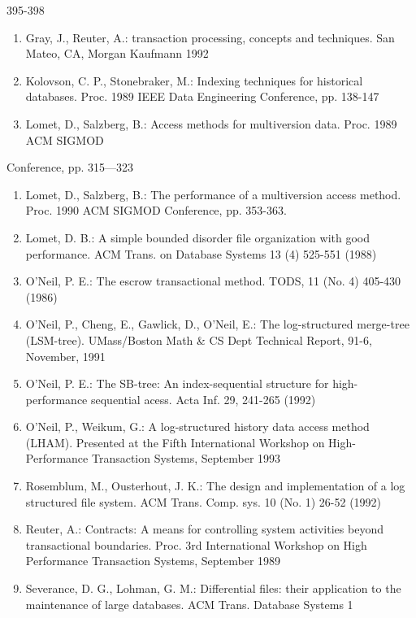 \documentclass[a4paper,12pt,notitlepage,twoside,openright]{article}
\begin{document}
395-398


\begin{enumerate}
\def\labelenumi{\arabic{enumi}.}
\setcounter{enumi}{13}
\item
  Gray, J., Reuter, A.: transaction processing, concepts and techniques.
  San Mateo, CA, Morgan Kaufmann 1992
\item
  Kolovson, C. P., Stonebraker, M.: Indexing techniques for historical
  databases. Proc. 1989 IEEE Data Engineering Conference, pp. 138-147
\item
  Lomet, D., Salzberg, B.: Access methods for multiversion data. Proc.
  1989 ACM SIGMOD
\end{enumerate}


Conference, pp. 315---323


\begin{enumerate}
\def\labelenumi{\arabic{enumi}.}
\setcounter{enumi}{16}
\item
  Lomet, D., Salzberg, B.: The performance of a multiversion access
  method. Proc. 1990 ACM SIGMOD Conference, pp. 353-363.
\item
  Lomet, D. B.: A simple bounded disorder file organization with good
  performance. ACM Trans. on Database Systems 13 (4) 525-551 (1988)
\item
  O'Neil, P. E.: The escrow transactional method. TODS, 11 (No. 4)
  405-430 (1986)
\item
  O'Neil, P., Cheng, E., Gawlick, D., O'Neil, E.: The log-structured
  merge-tree (LSM-tree). UMass/Boston Math \& CS Dept Technical Report,
  91-6, November, 1991
\item
  O'Neil, P. E.: The SB-tree: An index-sequential structure for
  high-performance sequential acess. Acta Inf. 29, 241-265 (1992)
\item
  O'Neil, P., Weikum, G.: A log-structured history data access method
  (LHAM). Presented at the Fifth International Workshop on
  High-Performance Transaction Systems, September 1993
\item
  Rosemblum, M., Ousterhout, J. K.: The design and implementation of a
  log structured file system. ACM Trans. Comp. sys. 10 (No. 1) 26-52
  (1992)
\item
  Reuter, A.: Contracts: A means for controlling system activities
  beyond transactional boundaries. Proc. 3rd International Workshop on
  High Performance Transaction Systems, September 1989
\item
  Severance, D. G., Lohman, G. M.: Differential files: their application
  to the maintenance of large databases. ACM Trans. Database Systems 1

\end{enumerate}
\end{document}
